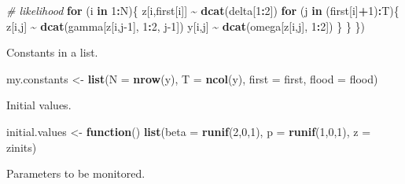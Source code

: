 \documentclass[
  12pt,
]{krantz}
\newenvironment{Shaded}{\begin{snugshade}}{\end{snugshade}}
\newcommand{\AttributeTok}[1]{\textcolor[rgb]{0.13,0.29,0.53}{#1}}
\newcommand{\CommentTok}[1]{\textcolor[rgb]{0.56,0.35,0.01}{\textit{#1}}}
\newcommand{\ControlFlowTok}[1]{\textcolor[rgb]{0.13,0.29,0.53}{\textbf{#1}}}
\newcommand{\DecValTok}[1]{\textcolor[rgb]{0.00,0.00,0.81}{#1}}
\newcommand{\FunctionTok}[1]{\textcolor[rgb]{0.13,0.29,0.53}{\textbf{#1}}}
\newcommand{\NormalTok}[1]{#1}
\newcommand{\OtherTok}[1]{\textcolor[rgb]{0.56,0.35,0.01}{#1}}
\newcommand{\SpecialCharTok}[1]{\textcolor[rgb]{0.81,0.36,0.00}{\textbf{#1}}}
\begin{document}
\begin{Shaded}
\begin{Highlighting}[]
  \CommentTok{\# likelihood}
  \ControlFlowTok{for}\NormalTok{ (i }\ControlFlowTok{in} \DecValTok{1}\SpecialCharTok{:}\NormalTok{N)\{}
\NormalTok{    z[i,first[i]] }\SpecialCharTok{\textasciitilde{}} \FunctionTok{dcat}\NormalTok{(delta[}\DecValTok{1}\SpecialCharTok{:}\DecValTok{2}\NormalTok{])}
    \ControlFlowTok{for}\NormalTok{ (j }\ControlFlowTok{in}\NormalTok{ (first[i]}\SpecialCharTok{+}\DecValTok{1}\NormalTok{)}\SpecialCharTok{:}\NormalTok{T)\{}
\NormalTok{      z[i,j] }\SpecialCharTok{\textasciitilde{}} \FunctionTok{dcat}\NormalTok{(gamma[z[i,j}\DecValTok{{-}1}\NormalTok{], }\DecValTok{1}\SpecialCharTok{:}\DecValTok{2}\NormalTok{, j}\DecValTok{{-}1}\NormalTok{])}
\NormalTok{      y[i,j] }\SpecialCharTok{\textasciitilde{}} \FunctionTok{dcat}\NormalTok{(omega[z[i,j], }\DecValTok{1}\SpecialCharTok{:}\DecValTok{2}\NormalTok{])}
\NormalTok{    \}}
\NormalTok{  \}}
\NormalTok{\})}
\end{Highlighting}
\end{Shaded}

Constants in a list.

\begin{Shaded}
\begin{Highlighting}[]
\NormalTok{my.constants }\OtherTok{\textless{}{-}} \FunctionTok{list}\NormalTok{(}\AttributeTok{N =} \FunctionTok{nrow}\NormalTok{(y),}
                     \AttributeTok{T =} \FunctionTok{ncol}\NormalTok{(y),}
                     \AttributeTok{first =}\NormalTok{ first,}
                     \AttributeTok{flood =}\NormalTok{ flood)}
\end{Highlighting}
\end{Shaded}

Initial values.

\begin{Shaded}
\begin{Highlighting}[]
\NormalTok{initial.values }\OtherTok{\textless{}{-}} \ControlFlowTok{function}\NormalTok{() }\FunctionTok{list}\NormalTok{(}\AttributeTok{beta =} \FunctionTok{runif}\NormalTok{(}\DecValTok{2}\NormalTok{,}\DecValTok{0}\NormalTok{,}\DecValTok{1}\NormalTok{),}
                                  \AttributeTok{p =} \FunctionTok{runif}\NormalTok{(}\DecValTok{1}\NormalTok{,}\DecValTok{0}\NormalTok{,}\DecValTok{1}\NormalTok{),}
                                  \AttributeTok{z =}\NormalTok{ zinits)}
\end{Highlighting}
\end{Shaded}

Parameters to be monitored.
\end{document}
